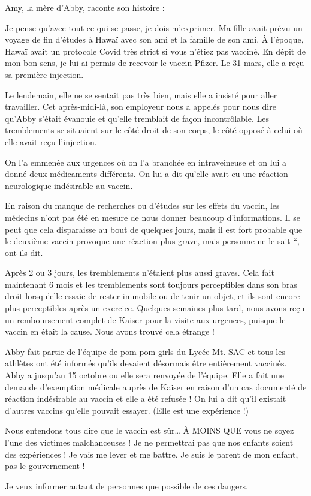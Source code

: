Amy, la mère d'Abby, raconte son histoire :

Je pense qu'avec tout ce qui se passe, je dois m'exprimer. Ma fille avait prévu
un voyage de fin d'études à Hawaï avec son ami et la famille de son ami. À
l'époque, Hawaï avait un protocole Covid très strict si vous n'étiez pas
vacciné. En dépit de mon bon sens, je lui ai permis de recevoir le vaccin
Pfizer. Le 31 mars, elle a reçu sa première injection.

Le lendemain, elle ne se sentait pas très bien, mais elle a insisté pour aller
travailler. Cet après-midi-là, son employeur nous a appelés pour nous dire
qu'Abby s'était évanouie et qu'elle tremblait de façon incontrôlable. Les
tremblements se situaient sur le côté droit de son corps, le côté opposé à celui
où elle avait reçu l'injection.

On l'a emmenée aux urgences où on l'a branchée en intraveineuse et on lui a
donné deux médicaments différents. On lui a dit qu'elle avait eu une réaction
neurologique indésirable au vaccin.

En raison du manque de recherches ou d'études sur les effets du vaccin, les
médecins n'ont pas été en mesure de nous donner beaucoup d'informations. Il se
peut que cela disparaisse au bout de quelques jours, mais il est fort probable
que le deuxième vaccin provoque une réaction plus grave, mais personne ne le
sait “, ont-ils dit.

Après 2 ou 3 jours, les tremblements n'étaient plus aussi graves. Cela fait
maintenant 6 mois et les tremblements sont toujours perceptibles dans son bras
droit lorsqu'elle essaie de rester immobile ou de tenir un objet, et ils sont
encore plus perceptibles après un exercice. Quelques semaines plus tard, nous
avons reçu un remboursement complet de Kaiser pour la visite aux urgences,
puisque le vaccin en était la cause. Nous avons trouvé cela étrange !

Abby fait partie de l'équipe de pom-pom girls du Lycée Mt. SAC et tous les
athlètes ont été informés qu'ils devaient désormais être entièrement
vaccinés. Abby a jusqu'au 15 octobre ou elle sera renvoyée de l'équipe. Elle a
fait une demande d'exemption médicale auprès de Kaiser en raison d'un cas
documenté de réaction indésirable au vaccin et elle a été refusée ! On lui a dit
qu'il existait d'autres vaccins qu'elle pouvait essayer. (Elle est une
expérience !)

Nous entendons tous dire que le vaccin est sûr… À MOINS QUE vous ne soyez l'une
des victimes malchanceuses ! Je ne permettrai pas que nos enfants soient des
expériences ! Je vais me lever et me battre. Je suis le parent de mon enfant,
pas le gouvernement !

Je veux informer autant de personnes que possible de ces dangers.

